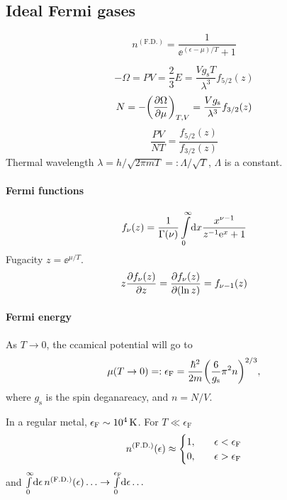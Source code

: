 \documentclass[11pt,letter, swedish, english, twocolumn
]{article}
\newcommand{\gs}{\ensuremath{{g_{\text{s}}}}}
\newcommand{\eF}{\ensuremath{{\epsilon_{\text{F}}}}}
\begin{document}
\subsection{Ideal Fermi gases}
\begin{equation}
n^{(\text{F.D.})}=\frac{1}{\ee^{(\epsilon-\mu)/T}+1}
\end{equation}

\begin{equation}
-\Omega=PV=\frac{2}{3}E=\frac{V\gs T}{\lambda^3}f_{5/2}(z)
\end{equation}
\begin{equation}
N=-\qty(\pdv{\Omega}{\mu})_{T,V}=\frac{V\gs}{\lambda^3}f_{3/2}(z)
\end{equation}
\begin{equation}
\frac{PV}{NT}=\frac{f_{5/2}(z)}{f_{3/2}(z)}
\end{equation}
Thermal wavelength $\lambda=h/\sqrt{2\pi mT}=:\Lambda/\sqrt{T}$, $\Lambda$ is a constant.

\paragraph{Fermi functions}
\begin{equation}
f_\nu(z)=\frac{1}{\Gamma(\nu)}\int_0^\infty \!\rd{x}
\frac{x^{\nu-1}}{z^{-1}\ee^x + 1}
\end{equation}
Fugacity $z=\ee^{\mu/T}$.
\begin{equation}
z\pdv{f_\nu(z)}{z} = \pdv{f_\nu(z)}{(\ln z)}=f_{\nu-1}(z)
\end{equation}

\paragraph{Fermi energy}
As $T\to0$, the ccamical potential will go to
\begin{equation}
\mu(T\to0)=:\eF=\frac{\hbar^2}{2m}\qty(\frac{6}{\gs}\pi^2n)^{2/3},
\end{equation}
where $\gs$ is the spin deganareacy, and $n=N/V$. 

In a regular metal, $\eF\sim\unit[10^4]{K}$. For $T\ll\eF$
\begin{equation}
n^{(\text{F.D.})}(\epsilon)\approx
\begin{cases}
1\qcomma&\epsilon<\eF\\
0\qcomma&\epsilon>\eF
\end{cases}
\end{equation}
and $\int_0^\infty\!\rd\epsilon\,n^{(\text{F.D.})}(\epsilon)\ldots
\to\int_0^\eF\!\rd\epsilon\ldots$
\end{document}
